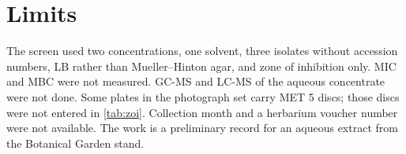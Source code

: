 \section{Limits}

The screen used two concentrations, one solvent, three isolates without accession numbers, LB rather than Mueller--Hinton agar, and zone of inhibition only. MIC and MBC were not measured. GC-MS and LC-MS of the aqueous concentrate were not done. Some plates in the photograph set carry MET 5 discs; those discs were not entered in \cref{tab:zoi}. Collection month and a herbarium voucher number were not available. The work is a preliminary \invitro{} record for an aqueous extract from the Botanical Garden stand.

\FloatBarrier

